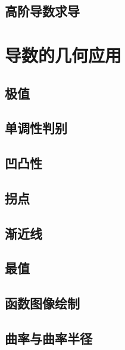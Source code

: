 \documentclass[8pt a4paper, oneside, UTF8]{ctexbook}  %
\begin{document}
\begin{sloppypar}
    \subsection{高阶导数求导}
    \section{导数的几何应用}
    \subsection{极值}
    \subsection{单调性判别}
    \subsection{凹凸性}
    \subsection{拐点}
    \subsection{渐近线}
    \subsection{最值}
    \subsection{函数图像绘制}
    \subsection{曲率与曲率半径}
        \ifx\allfiles\undefined
    \end{sloppypar}
\end{document}
